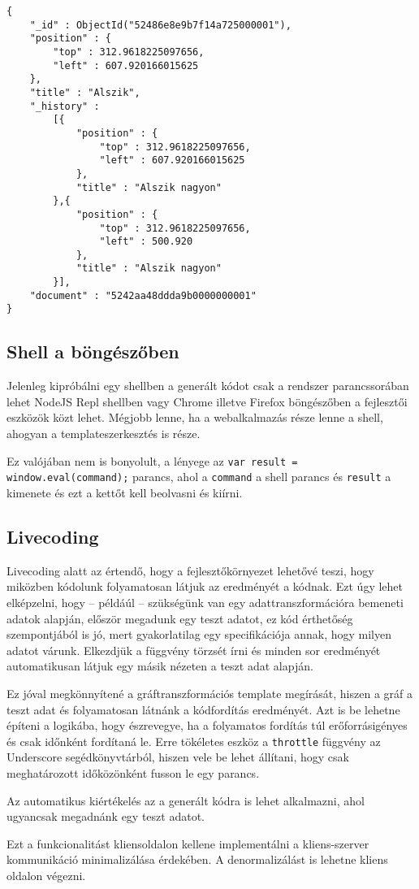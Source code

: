 \begin{lstlisting}[caption=Entitás történettel együtt]
  {
    "_id" : ObjectId("52486e8e9b7f14a725000001"),
    "position" : {
        "top" : 312.9618225097656,
        "left" : 607.920166015625
    },
    "title" : "Alszik",
    "_history" :
        [{
            "position" : {
                "top" : 312.9618225097656,
                "left" : 607.920166015625
            },
            "title" : "Alszik nagyon"
        },{
            "position" : {
                "top" : 312.9618225097656,
                "left" : 500.920
            },
            "title" : "Alszik nagyon"
        }],
    "document" : "5242aa48ddda9b0000000001"
}
\end{lstlisting}

\subsection{Shell a böngészőben}

Jelenleg kipróbálni egy shellben a generált kódot csak a rendszer parancssorában lehet NodeJS Repl shellben vagy Chrome illetve Firefox böngészőben a fejlesztői eszközök közt lehet. Mégjobb lenne, ha a webalkalmazás része lenne a shell, ahogyan a templateszerkesztés is része.

Ez valójában nem is bonyolult, a lényege az \lstinline{var result = window.eval(command);} parancs, ahol a \lstinline{command} a shell parancs és \lstinline{result} a kimenete és ezt a kettőt kell beolvasni és kiírni.

\subsection{Livecoding}

Livecoding alatt az értendő, hogy a fejlesztőkörnyezet lehetővé teszi, hogy miközben kódolunk folyamatosan látjuk az eredményét a kódnak. Ezt úgy lehet elképzelni, hogy -- példáúl -- szükségünk van egy adattranszformációra bemeneti adatok alapján, először megadunk egy teszt adatot, ez kód érthetőség szempontjából is jó, mert gyakorlatilag egy specifikációja annak, hogy milyen adatot várunk. Elkezdjük a függvény törzsét írni és minden sor eredményét automatikusan látjuk egy másik nézeten a teszt adat alapján.

Ez jóval megkönnyítené a gráftranszformációs template megírását, hiszen a gráf a teszt adat és folyamatosan látnánk a kódfordítás eredményét. Azt is be lehetne építeni a logikába, hogy észrevegye, ha a folyamatos fordítás túl erőforrásigényes és csak időnként fordítaná le. Erre tökéletes eszköz a \lstinline{throttle} függvény az Underscore segédkönyvtárból, hiszen vele be lehet állítani, hogy csak meghatározott időközönként fusson le egy parancs.

Az automatikus kiértékelés az a generált kódra is lehet alkalmazni, ahol ugyancsak megadnánk egy teszt adatot. 

Ezt a funkcionalitást kliensoldalon kellene implementálni a kliens-szerver kommunikáció minimalizálása érdekében. A denormalizálást is lehetne kliens oldalon végezni.